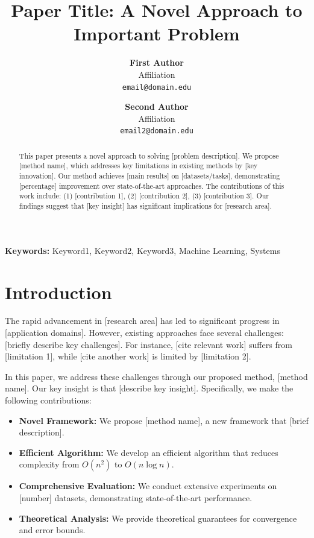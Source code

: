 \documentclass[10pt,twocolumn]{article}
\newcommand{\keywords}[1]{\textbf{Keywords:} #1}
\begin{document}
\title{Paper Title: A Novel Approach to Important Problem}

\author{
    \textbf{First Author}\\
    Affiliation\\
    \texttt{email@domain.edu}
    \and
    \textbf{Second Author}\\
    Affiliation\\
    \texttt{email2@domain.edu}
}

\maketitle

\begin{abstract}
This paper presents a novel approach to solving [problem description]. We propose [method name], which addresses key limitations in existing methods by [key innovation]. Our method achieves [main results] on [datasets/tasks], demonstrating [percentage] improvement over state-of-the-art approaches. The contributions of this work include: (1) [contribution 1], (2) [contribution 2], (3) [contribution 3]. Our findings suggest that [key insight] has significant implications for [research area].
\end{abstract}

\keywords{Keyword1, Keyword2, Keyword3, Machine Learning, Systems}

\section{Introduction}
\label{sec:introduction}

The rapid advancement in [research area] has led to significant progress in [application domains]. However, existing approaches face several challenges: [briefly describe key challenges]. For instance, [cite relevant work] suffers from [limitation 1], while [cite another work] is limited by [limitation 2].

In this paper, we address these challenges through our proposed method, [method name]. Our key insight is that [describe key insight]. Specifically, we make the following contributions:

\begin{itemize}
    \item \textbf{Novel Framework:} We propose [method name], a new framework that [brief description].
    \item \textbf{Efficient Algorithm:} We develop an efficient algorithm that reduces complexity from $O(n^2)$ to $O(n \log n)$.
    \item \textbf{Comprehensive Evaluation:} We conduct extensive experiments on [number] datasets, demonstrating state-of-the-art performance.
    \item \textbf{Theoretical Analysis:} We provide theoretical guarantees for convergence and error bounds.
\end{itemize}
\end{document}
